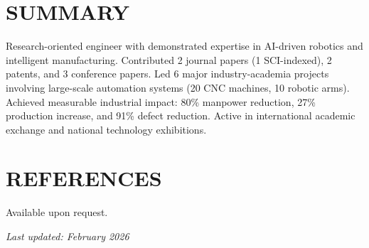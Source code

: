 \documentclass[11pt,a4paper]{article}
\begin{document}
\section*{SUMMARY}

Research-oriented engineer with demonstrated expertise in AI-driven robotics and intelligent manufacturing. Contributed 2 journal papers (1 SCI-indexed), 2 patents, and 3 conference papers. Led 6 major industry-academia projects involving large-scale automation systems (20 CNC machines, 10 robotic arms). Achieved measurable industrial impact: 80\% manpower reduction, 27\% production increase, and 91\% defect reduction. Active in international academic exchange and national technology exhibitions.

\section*{REFERENCES}

Available upon request.

\vfill

\begin{center}
\textit{Last updated: February 2026}
\end{center}
\end{document}
